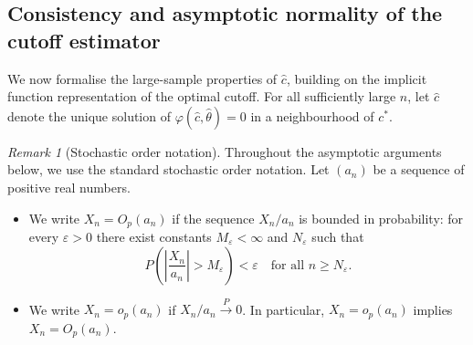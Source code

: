 \documentclass[11pt,a4paper]{article}
\theoremstyle{definition}
\theoremstyle{remark}
\newtheorem{remark}[theorem]{Remark}
\newcommand{\1}{\mathbf{1}}
\begin{document}
\subsection{Consistency and asymptotic normality of the cutoff estimator}

We now formalise the large-sample properties of $\hat c$, building on the implicit function representation of the optimal cutoff. For all sufficiently large $n$, let $\hat c$ denote the unique solution of $\varphi(\hat c,\hat\theta)=0$ in a neighbourhood of
$c^*$.

\begin{remark}[Stochastic order notation]
\label{rem:stochastic-order}
Throughout the asymptotic arguments below, we use the standard
stochastic order notation. Let $(a_n)$ be a sequence of positive real numbers.
\begin{itemize}
  \item We write $X_n = O_p(a_n)$ if the sequence $X_n/a_n$ is bounded
        in probability: for every $\varepsilon > 0$ there exist constants
        $M_\varepsilon < \infty$ and $N_\varepsilon$ such that
        \[
        P\!\left(\left|\frac{X_n}{a_n}\right| > M_\varepsilon\right)
        < \varepsilon
        \quad \text{for all } n \geq N_\varepsilon.
        \]
  \item We write $X_n = o_p(a_n)$ if $X_n/a_n \xrightarrow{P} 0$.
        In particular, $X_n = o_p(a_n)$ implies $X_n = O_p(a_n)$.
\end{itemize}
\end{remark}
\end{document}
